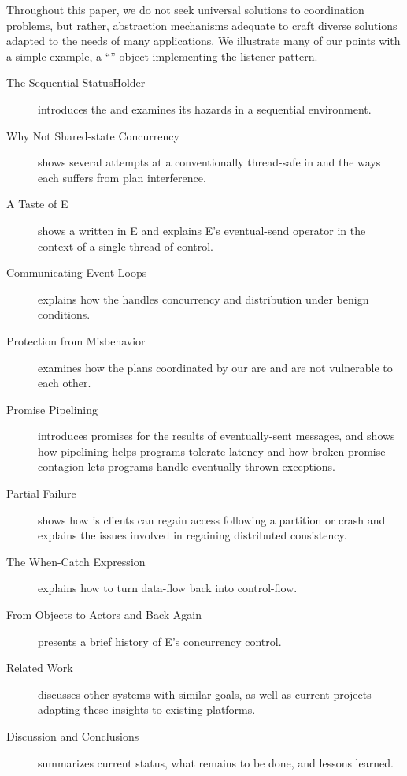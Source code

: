 \documentclass{llncs}
\begin{document}
Throughout this paper, we do not seek universal solutions to coordination
problems, but rather, abstraction mechanisms adequate to craft diverse
solutions adapted to the needs of many applications. We illustrate
many of our points with a simple example, a ``''
object implementing the listener pattern.
%
\begin{description}
\item[The Sequential StatusHolder] introduces the 
and examines its hazards in a sequential environment.

\item[Why Not Shared-state Concurrency] shows several
attempts at a conventionally thread-safe  in
 and the ways each suffers from plan interference.

\item[A Taste of E] shows a  written in E and explains
E's eventual-send operator in the context of a single thread of
control.

\item[Communicating Event-Loops] explains how the 
handles concurrency and distribution under benign conditions.

\item[Protection from Misbehavior] examines how the plans coordinated
by our  are and are not vulnerable to each other.

\item[Promise Pipelining] introduces promises for the results of
eventually-sent messages, and shows how pipelining helps programs
tolerate latency and how broken promise contagion lets programs handle
eventually-thrown exceptions.

\item[Partial Failure] shows how 's clients can
regain access following a partition or crash and explains the issues
involved in regaining distributed consistency.

\item[The When-Catch Expression] explains how to turn data-flow back
into control-flow.

\item[From Objects to Actors and Back Again] presents a
brief history of E's concurrency control.

\item[Related Work] discusses other systems with similar goals, as
well as current projects adapting these insights to existing
platforms.

\item[Discussion and Conclusions] summarizes current status, what
remains to be done, and lessons learned.

\end{description}
\end{document}
